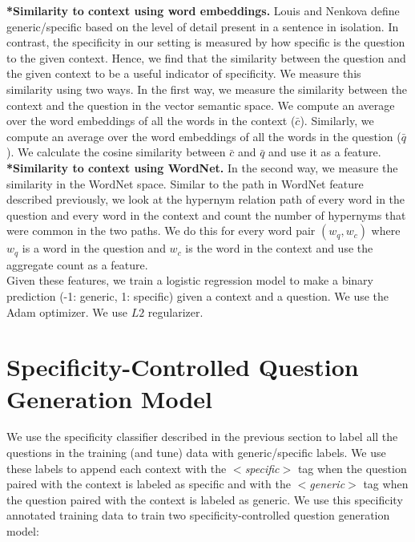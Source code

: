 \documentclass[11pt,a4paper]{article}
\begin{document}
\noindent \textbf{*Similarity to context using word embeddings.} Louis and Nenkova \cite{louis2011automatic} define generic/specific based on the level of detail present in a sentence in isolation. In contrast, the specificity in our setting is measured by how specific is the question to the given context. Hence, we find that the similarity between the question and the given context to be a useful indicator of specificity. We measure this similarity using two ways. In the first way, we measure the similarity between the context and the question in the vector semantic space. We compute an average over the word embeddings of all the words in the context ($\bar{c}$). Similarly, we  compute an average over the word embeddings of all the words in the question ($\bar{q}$). We calculate the cosine similarity between $\bar{c}$ and $\bar{q}$ and use it as a feature. \\
 
\noindent \textbf{*Similarity to context using WordNet.} In the second way, we measure the similarity in the WordNet space. Similar to the path in WordNet feature described previously, we look at the hypernym relation path of every word in the question and every word in the context and count the number of hypernyms that were common in the two paths. We do this for every word pair $(w_q, w_c)$ where $w_q$ is a word in the question and $w_c$ is the word in the context and use the aggregate count as a feature. \\


Given these features, we train a logistic regression model to make a binary prediction (-1: generic, 1: specific) given a context and a question. We use the Adam \cite{kingma2014adam} optimizer. We use $L2$ regularizer. 

\section{Specificity-Controlled Question Generation Model}

We use the specificity classifier described in the previous section to label all the questions in the training (and tune) data with generic/specific labels. 
We use these labels to append each context with the \textit{$<$specific$>$} tag when the question paired with the context is labeled as specific and with the \textit{$<$generic$>$} tag when the question paired with the context is labeled as generic.
We use this specificity annotated training data to train two specificity-controlled question generation model:\\
\end{document}

